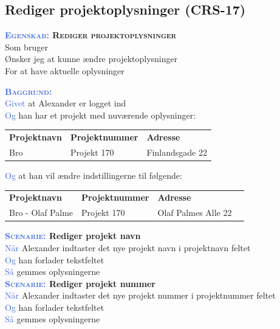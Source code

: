 \subsection{Rediger projektoplysninger (CRS-17)} \label{sec:USRedigerProjekt}
\textbf{\textsc{\textcolor{RoyalBlue}{Egenskab:} Rediger projektoplysninger}}\\
Som bruger\\
Ønsker jeg at kunne ændre projektoplysninger\\
For at have aktuelle oplysninger

\textsc{\textcolor{RoyalBlue}{\textbf{Baggrund:}}}\\
\textcolor{RoyalBlue}{Givet} at Alexander er logget ind\\
\textcolor{RoyalBlue}{Og} han har et projekt med nuværende oplysninger:\\
\begin{tabular}{| l | l | l |}
	\textbf{Projektnavn} & \textbf{Projektnummer} & \textbf{Adresse} \\
	Bro & Projekt 170 & Finlandsgade 22 \\
\end{tabular}
\newline \newline
\textcolor{RoyalBlue}{Og} at han vil ændre indstillingerne til følgende:\\
\begin{tabular}{| l | l | l | l |}
	\textbf{Projektnavn} & \textbf{Projektnummer} & \textbf{Adresse} \\
	Bro - Olaf Palme & Projekt 170 & Olaf Palmes Alle 22 \\
\end{tabular}
\newline

\textbf{\textsc{\textcolor{RoyalBlue}{Scenarie:}} Rediger projekt navn}\\
\textcolor{RoyalBlue}{Når} Alexander indtaster det nye projekt navn i projektnavn feltet\\
\textcolor{RoyalBlue}{Og} han forlader tekstfeltet\\
\textcolor{RoyalBlue}{Så} gemmes oplysningerne\\

\textbf{\textsc{\textcolor{RoyalBlue}{Scenarie:}} Rediger projekt nummer}\\
\textcolor{RoyalBlue}{Når} Alexander indtaster det nye projekt nummer i projektnummer feltet\\
\textcolor{RoyalBlue}{Og} han forlader tekstfeltet\\
\textcolor{RoyalBlue}{Så} gemmes oplysningerne\\

